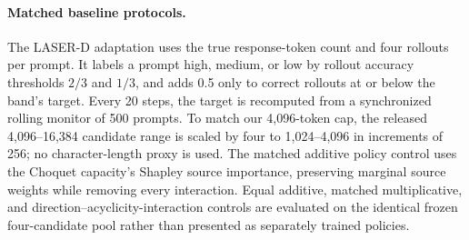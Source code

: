 \paragraph{Matched baseline protocols.}
The LASER-D adaptation uses the true response-token count and four rollouts per prompt. It labels a prompt high, medium, or low by rollout accuracy thresholds $2/3$ and $1/3$, and adds 0.5 only to correct rollouts at or below the band's target. Every 20 steps, the target is recomputed from a synchronized rolling monitor of 500 prompts. To match our 4,096-token cap, the released 4,096--16,384 candidate range is scaled by four to 1,024--4,096 in increments of 256; no character-length proxy is used. The matched additive policy control uses the Choquet capacity's Shapley source importance, preserving marginal source weights while removing every interaction. Equal additive, matched multiplicative, and direction--acyclicity-interaction controls are evaluated on the identical frozen four-candidate pool rather than presented as separately trained policies.

